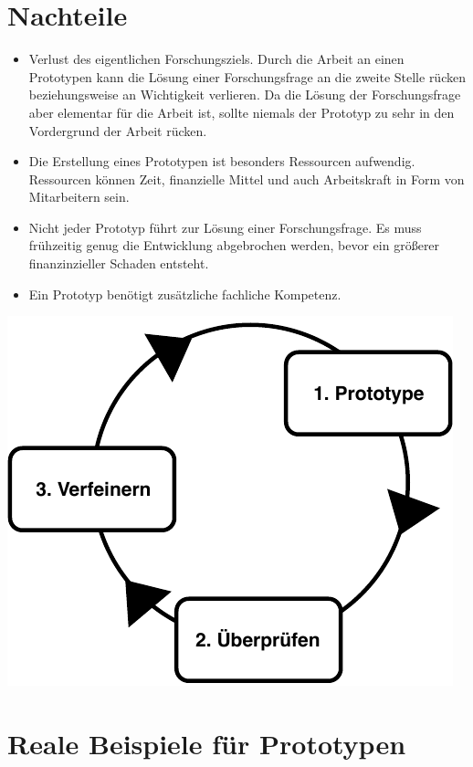 \documentclass[a0,portrait]{a0poster}
\begin{document}
\begin{multicols}{2}
\section*{Nachteile}
\begin{itemize}
    \item Verlust des eigentlichen Forschungsziels. Durch die Arbeit an einen Prototypen kann die Lösung einer Forschungsfrage an die zweite Stelle rücken beziehungsweise an Wichtigkeit verlieren. Da die Lösung der Forschungsfrage aber elementar für die Arbeit ist, sollte niemals der Prototyp zu sehr in den Vordergrund der Arbeit rücken.
    \item Die Erstellung eines Prototypen ist besonders Ressourcen aufwendig. Ressourcen können Zeit, finanzielle Mittel und auch Arbeitskraft in Form von Mitarbeitern sein.
    \item Nicht jeder Prototyp führt zur Lösung einer Forschungsfrage. Es muss frühzeitig genug die Entwicklung abgebrochen werden, bevor ein größerer finanzinzieller Schaden entsteht.
    \item Ein Prototyp benötigt zusätzliche fachliche Kompetenz.
\end{itemize}

\begin{center}\vspace{1cm}
\includegraphics[width=0.8\linewidth]{rapid_prototyping.pdf}
\end{center}\vspace{1cm}

\section*{Reale Beispiele für Prototypen}

\end{multicols}
\end{document}
